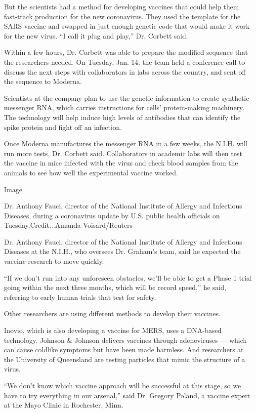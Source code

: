 But the scientists had a method for developing vaccines that could help
them fast-track production for the new coronavirus. They used the
template for the SARS vaccine and swapped in just enough genetic code
that would make it work for the new virus. ``I call it plug and play,''
Dr. Corbett said.

Within a few hours, Dr. Corbett was able to prepare the modified
sequence that the researchers needed. On Tuesday, Jan. 14, the team held
a conference call to discuss the next steps with collaborators in labs
across the country, and sent off the sequence to Moderna.

Scientists at the company plan to use the genetic information to create
synthetic messenger RNA, which carries instructions for cells'
protein-making machinery. The technology will help induce high levels of
antibodies that can identify the spike protein and fight off an
infection.

Once Moderna manufactures the messenger RNA in a few weeks, the N.I.H.
will run more tests, Dr. Corbett said. Collaborators in academic labs
will then test the vaccine in mice infected with the virus and check
blood samples from the animals to see how well the experimental vaccine
worked.

Image

Dr. Anthony Fauci, director of the National Institute of Allergy and
Infectious Diseases, during a coronavirus update by U.S. public health
officials on Tuesday.Credit...Amanda Voisard/Reuters

Dr. Anthony Fauci, director of the National Institute of Allergy and
Infectious Diseases at the N.I.H., who oversees Dr. Graham's team, said
he expected the vaccine research to move quickly.

``If we don't run into any unforeseen obstacles, we'll be able to get a
Phase 1 trial going within the next three months, which will be record
speed,'' he said, referring to early human trials that test for safety.

Other researchers are using different methods to develop their vaccines.

Inovio, which is also developing a vaccine for MERS, uses a DNA-based
technology. Johnson \& Johnson delivers vaccines through adenoviruses
--- which can cause coldlike symptoms but have been made harmless. And
researchers at the University of Queensland are testing particles that
mimic the structure of a virus.

``We don't know which vaccine approach will be successful at this stage,
so we have to try everything in our arsenal,'' said Dr. Gregory Poland,
a vaccine expert at the Mayo Clinic in Rochester, Minn.

